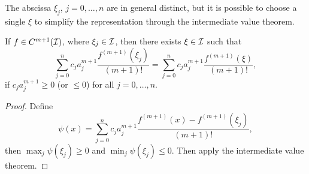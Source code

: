 \begin{remark}
    The abscissa $\xi_j$, $j=0,\dots,n$ are in general distinct, but it is possible to choose a single $\xi$ to simplify the representation through the intermediate value theorem. 
\end{remark}
\begin{lemma}\label{LEM: FD COEF}
    If $f\in C^{m+1}(\mathcal I)$, where $\xi_j\in\mathcal I$, then there exists $\xi\in \mathcal I$ such that 
    \begin{equation}
        \sum_{j=0}^n c_j  a_j^{m+1}\frac{f^{(m+1)}(\xi_j)}{(m+1)!} =   \sum_{j=0}^n c_j  a_j^{m+1}\frac{f^{(m+1)}(\xi)}{(m+1)!},
    \end{equation}
    if $c_j a_j^{m+1}\ge 0$ (or $\le 0$) for all $j=0,\dots, n$. 
\end{lemma}
\begin{proof}
    Define $$\psi(x) =  \sum_{j=0}^n c_j  a_j^{m+1}\frac{f^{(m+1)}(x) - f^{(m+1)}(\xi_j)}{(m+1)!}, $$
    then $\max_j \psi(\xi_j)\ge 0$ and $\min_j \psi(\xi_j) \le 0$. Then apply the intermediate value theorem. 
\end{proof}

